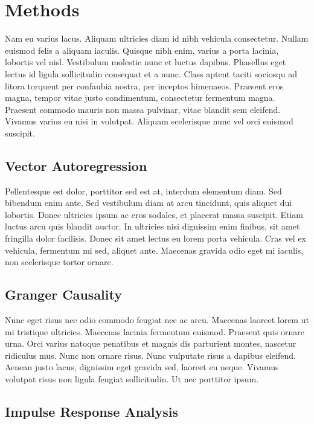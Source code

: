 \documentclass{article}
\begin{document}
\hypertarget{methods}{%
\section{Methods}\label{methods}}

Nam eu varius lacus. Aliquam ultricies diam id nibh vehicula
consectetur. Nullam euismod felis a aliquam iaculis. Quisque nibh enim,
varius a porta lacinia, lobortis vel nisl. Vestibulum molestie nunc et
luctus dapibus. Phasellus eget lectus id ligula sollicitudin consequat
et a nunc. Class aptent taciti sociosqu ad litora torquent per confaubia
nostra, per inceptos himenaeos. Praesent eros magna, tempor vitae justo
condimentum, consectetur fermentum magna. Praesent commodo mauris non
massa pulvinar, vitae blandit sem eleifend. Vivamus varius eu nisi in
volutpat. Aliquam scelerisque nunc vel orci euismod suscipit.

\hypertarget{vector-autoregression}{%
\subsection{Vector Autoregression}\label{vector-autoregression}}

Pellentesque est dolor, porttitor sed est at, interdum elementum diam.
Sed bibendum enim ante. Sed vestibulum diam at arcu tincidunt, quis
aliquet dui lobortis. Donec ultricies ipsum ac eros sodales, et placerat
massa suscipit. Etiam luctus arcu quis blandit auctor. In ultricies nisi
dignissim enim finibus, sit amet fringilla dolor facilisis. Donec sit
amet lectus eu lorem porta vehicula. Cras vel ex vehicula, fermentum mi
sed, aliquet ante. Maecenas gravida odio eget mi iaculis, non
scelerisque tortor ornare.

\hypertarget{granger-causality}{%
\subsection{Granger Causality}\label{granger-causality}}

Nunc eget risus nec odio commodo feugiat nec ac arcu. Maecenas laoreet
lorem ut mi tristique ultricies. Maecenas lacinia fermentum euismod.
Praesent quis ornare urna. Orci varius natoque penatibus et magnis dis
parturient montes, nascetur ridiculus mus. Nunc non ornare risus. Nunc
vulputate risus a dapibus eleifend. Aenean justo lacus, dignissim eget
gravida sed, laoreet eu neque. Vivamus volutpat risus non ligula feugiat
sollicitudin. Ut nec porttitor ipsum.

\hypertarget{impulse-response-analysis}{%
\subsection{Impulse Response Analysis}\label{impulse-response-analysis}}
\end{document}
